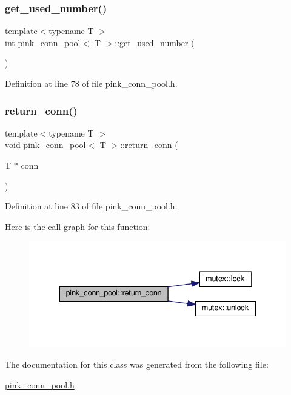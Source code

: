 \subsubsection{\texorpdfstring{get\+\_\+used\+\_\+number()}{get\_used\_number()}}
{\footnotesize\ttfamily template$<$typename T $>$ \\
int \hyperlink{classpink__conn__pool}{pink\+\_\+conn\+\_\+pool}$<$ T $>$\+::get\+\_\+used\+\_\+number (\begin{DoxyParamCaption}{ }\end{DoxyParamCaption})}



Definition at line 78 of file pink\+\_\+conn\+\_\+pool.\+h.

\mbox{\label{classpink__conn__pool_a331df25708f142559d051ab8859ed707}} 
\subsubsection{\texorpdfstring{return\+\_\+conn()}{return\_conn()}}
{\footnotesize\ttfamily template$<$typename T $>$ \\
void \hyperlink{classpink__conn__pool}{pink\+\_\+conn\+\_\+pool}$<$ T $>$\+::return\+\_\+conn (\begin{DoxyParamCaption}\item[{T $\ast$}]{conn }\end{DoxyParamCaption})}



Definition at line 83 of file pink\+\_\+conn\+\_\+pool.\+h.

Here is the call graph for this function\+:
\nopagebreak
\begin{figure}[H]
\begin{center}
\leavevmode
\includegraphics[width=335pt]{classpink__conn__pool_a331df25708f142559d051ab8859ed707_cgraph}
\end{center}
\end{figure}


The documentation for this class was generated from the following file\+:\begin{DoxyCompactItemize}
\item 
\hyperlink{pink__conn__pool_8h}{pink\+\_\+conn\+\_\+pool.\+h}\end{DoxyCompactItemize}
